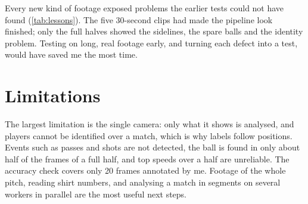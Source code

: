 Every new kind of footage exposed problems the earlier tests could not have found (\autoref{tab:lessons}). The five 30-second clips had made the pipeline look finished; only the full halves showed the sidelines, the spare balls and the identity problem. Testing on long, real footage early, and turning each defect into a test, would have saved me the most time.

\section{Limitations}
\label{sec:limitations}

The largest limitation is the single camera: only what it shows is analysed, and players cannot be identified over a match, which is why labels follow positions. Events such as passes and shots are not detected, the ball is found in only about half of the frames of a full half, and top speeds over a half are unreliable. The accuracy check covers only 20 frames annotated by me. Footage of the whole pitch, reading shirt numbers, and analysing a match in segments on several workers in parallel are the most useful next steps.
